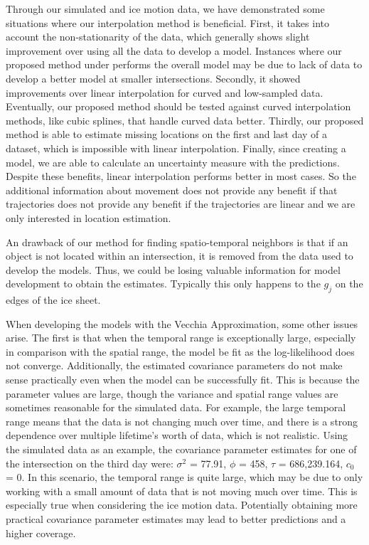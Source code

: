 \documentclass[12pt]{article}
\begin{document}
Through our simulated and ice motion data, we have demonstrated some
situations where our interpolation method is beneficial. First, it takes
into account the non-stationarity of the data, which generally shows
slight improvement over using all the data to develop a model. Instances
where our proposed method under performs the overall model may be due to
lack of data to develop a better model at smaller intersections.
Secondly, it showed improvements over linear interpolation for curved
and low-sampled data. Eventually, our proposed method should be tested
against curved interpolation methods, like cubic splines, that handle
curved data better. Thirdly, our proposed method is able to estimate
missing locations on the first and last day of a dataset, which is
impossible with linear interpolation. Finally, since creating a model,
we are able to calculate an uncertainty measure with the predictions.
Despite these benefits, linear interpolation performs better in most
cases. So the additional information about movement does not provide any
benefit if that trajectories does not provide any benefit if the
trajectories are linear and we are only interested in location
estimation.

An drawback of our method for finding spatio-temporal neighbors is that
if an object is not located within an intersection, it is removed from
the data used to develop the models. Thus, we could be losing valuable
information for model development to obtain the estimates. Typically
this only happens to the \(g_j\) on the edges of the ice sheet.

When developing the models with the Vecchia Approximation, some other
issues arise. The first is that when the temporal range is exceptionally
large, especially in comparison with the spatial range, the model be fit
as the log-likelihood does not converge. Additionally, the estimated
covariance parameters do not make sense practically even when the model
can be successfully fit. This is because the parameter values are large,
though the variance and spatial range values are sometimes reasonable
for the simulated data. For example, the large temporal range means that
the data is not changing much over time, and there is a strong
dependence over multiple lifetime's worth of data, which is not
realistic. Using the simulated data as an example, the covariance
parameter estimates for one of the intersection on the third day were:
\(\sigma^2\) = 77.91, \(\phi\) = 458, \(\tau\) = 686,239.164, \(c_0\) =
0. In this scenario, the temporal range is quite large, which may be due
to only working with a small amount of data that is not moving much over
time. This is especially true when considering the ice motion data.
Potentially obtaining more practical covariance parameter estimates may
lead to better predictions and a higher coverage.
\end{document}
